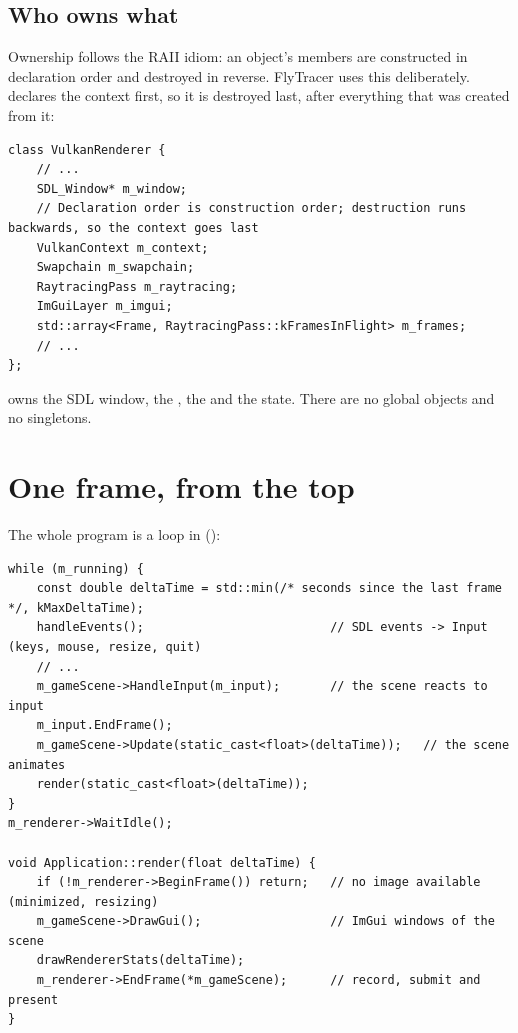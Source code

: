 \documentclass[11pt,a4paper]{article}
\begin{document}
\subsection{Who owns what}

Ownership follows the RAII idiom: an object's members are constructed in declaration order and destroyed in reverse. FlyTracer uses this deliberately.  declares the context first, so it is destroyed last, after everything that was created from it:

\begin{lstlisting}
class VulkanRenderer {
    // ...
    SDL_Window* m_window;
    // Declaration order is construction order; destruction runs backwards, so the context goes last
    VulkanContext m_context;
    Swapchain m_swapchain;
    RaytracingPass m_raytracing;
    ImGuiLayer m_imgui;
    std::array<Frame, RaytracingPass::kFramesInFlight> m_frames;
    // ...
};
\end{lstlisting}

 owns the SDL window, the , the  and the  state. There are no global objects and no singletons.

\section{One frame, from the top}

The whole program is a loop in  ():

\begin{lstlisting}
while (m_running) {
    const double deltaTime = std::min(/* seconds since the last frame */, kMaxDeltaTime);
    handleEvents();                          // SDL events -> Input (keys, mouse, resize, quit)
    // ...
    m_gameScene->HandleInput(m_input);       // the scene reacts to input
    m_input.EndFrame();
    m_gameScene->Update(static_cast<float>(deltaTime));   // the scene animates
    render(static_cast<float>(deltaTime));
}
m_renderer->WaitIdle();

void Application::render(float deltaTime) {
    if (!m_renderer->BeginFrame()) return;   // no image available (minimized, resizing)
    m_gameScene->DrawGui();                  // ImGui windows of the scene
    drawRendererStats(deltaTime);
    m_renderer->EndFrame(*m_gameScene);      // record, submit and present
}
\end{lstlisting}
\end{document}
